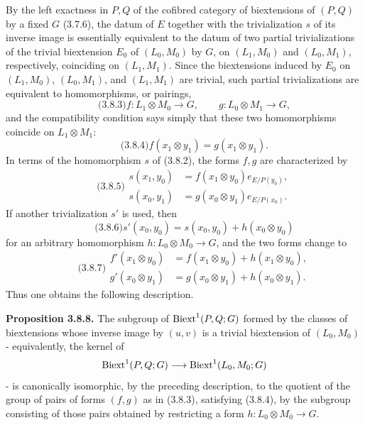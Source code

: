 \documentclass[11pt]{article}
\begin{document}
By the left exactness in \(P,Q\) of the cofibred category of biextensions of \((P,Q)\) by a fixed \(G\) (3.7.6), the datum of \(E\) together with the trivialization \(s\) of its inverse image is essentially equivalent to the datum of two partial trivializations of the trivial biextension \(E_0\) of \((L_0,M_0)\) by \(G\), on \((L_1,M_0)\) and \((L_0,M_1)\), respectively, coinciding on \((L_1,M_1)\).  Since the biextensions induced by \(E_0\) on \((L_1,M_0)\), \((L_0,M_1)\), and \((L_1,M_1)\) are trivial, such partial trivializations are equivalent to homomorphisms, or pairings,
\begin{equation}\qquad\text{(3.8.3)}
        f:L_1\otimes M_0\longrightarrow G,
        \qquad
        g:L_0\otimes M_1\longrightarrow G,
\end{equation}
and the compatibility condition says simply that these two homomorphisms coincide on \(L_1\otimes M_1\):
\begin{equation}\qquad\text{(3.8.4)}
        f(x_1\otimes y_1)=g(x_1\otimes y_1).
\end{equation}
In terms of the homomorphism \(s\) of (3.8.2), the forms \(f,g\) are characterized by
\begin{equation}\qquad\text{(3.8.5)}
\begin{aligned}
 s(x_1,y_0)&=f(x_1\otimes y_0)e_{E/P(y_0)},\\
 s(x_0,y_1)&=g(x_0\otimes y_1)e_{E/P(x_0)}.
\end{aligned}
\end{equation}
If another trivialization \(s'\) is used, then
\begin{equation}\qquad\text{(3.8.6)}
        s'(x_0,y_0)=s(x_0,y_0)+h(x_0\otimes y_0)
\end{equation}
for an arbitrary homomorphism \(h:L_0\otimes M_0\to G\), and the two forms change to
\begin{equation}\qquad\text{(3.8.7)}
\begin{aligned}
 f'(x_1\otimes y_0)&=f(x_1\otimes y_0)+h(x_1\otimes y_0),\\
 g'(x_0\otimes y_1)&=g(x_0\otimes y_1)+h(x_0\otimes y_1).
\end{aligned}
\end{equation}
Thus one obtains the following description.

\textbf{Proposition 3.8.8.}  The subgroup of \(\operatorname{Biext}^1(P,Q;G)\) formed by the classes of biextensions whose inverse image by \((u,v)\) is a trivial biextension of \((L_0,M_0)\) - equivalently, the kernel of
\[
        \operatorname{Biext}^1(P,Q;G)\longrightarrow \operatorname{Biext}^1(L_0,M_0;G)
\]
- is canonically isomorphic, by the preceding description, to the quotient of the group of pairs of forms \((f,g)\) as in (3.8.3), satisfying (3.8.4), by the subgroup consisting of those pairs obtained by restricting a form \(h:L_0\otimes M_0\to G\).
\end{document}
